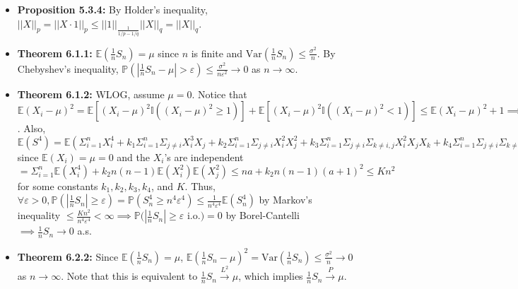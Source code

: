 \documentclass[12pt]{article}
\newcommand{\E}{\mathbb{E}}
\newcommand{\I}{\mathbb{I}}
\newcommand{\p}{\mathbb{P}}
\newcommand{\V}{\text{Var}}
\begin{document}
\begin{itemize}
    \item \textbf{Proposition 5.3.4:} By Holder's inequality, $||X||_p = ||X \cdot 1||_p \leq ||1||_{\frac{1}{1/p - 1/q}}||X||_q = ||X||_q$.
    \item \textbf{Theorem 6.1.1:} $\E(\frac{1}{n}S_n) = \mu$ since $n$ is finite and $\V(\frac{1}{n}S_n) \leq \frac{\sigma^2}{n}$. By Chebyshev's inequality, $\p(|\frac{1}{n}S_n - \mu| > \varepsilon) \leq \frac{\sigma^2}{n\varepsilon^2} \to 0$ as $n \to \infty$.
    \item \textbf{Theorem 6.1.2:} WLOG, assume $\mu = 0$. Notice that $\E(X_i - \mu)^2 = \E[(X_i - \mu)^2 \I((X_i - \mu)^2 \geq 1)] + \E[(X_i - \mu)^2 \I((X_i - \mu)^2 < 1)] \leq \E(X_i - \mu)^2 + 1 \implies \E(X_i - \mu)^2 \leq a + 1$. Also, $\E(S^4) = \E(\Sigma_{i=1}^n X_i^4 + k_1 \Sigma_{i=1}^n \Sigma_{j\neq i} X_i^3 X_j + k_2 \Sigma_{i=1}^n \Sigma_{j\neq i} X_i^2 X_j^2 + k_3 \Sigma_{i=1}^n \Sigma_{j\neq i} \Sigma_{k\neq i,j} X_i^2 X_j X_k + k_4 \Sigma_{i=1}^n \Sigma_{j\neq i} \Sigma_{k\neq i,j} \Sigma_{\ell \neq i,j,k} X_i X_j X_k X_\ell) = \E(\Sigma_{i=1}^n X_i^4 + k_2 \Sigma_{i=1}^n \Sigma_{j\neq i} X_i^2 X_j^2)$ since $\E(X_i) = \mu = 0$ and the $X_i$'s are independent $= \Sigma_{i=1}^n \E(X_i^4) + k_2 n(n-1)\E(X_i^2)\E(X_j^2) \leq na + k_2 n(n-1)(a+1)^2 \leq Kn^2$ for some constants $k_1, k_2, k_3, k_4$, and $K$. Thus, $\forall \varepsilon > 0, \p(|\frac{1}{n}S_n| \geq \varepsilon) = \p(S_n^4 \geq n^4\varepsilon^4) \leq \frac{1}{n^4\varepsilon^4}\E(S_n^4)$ by Markov's inequality $\leq \frac{Kn^2}{n^4\varepsilon^4} < \infty \implies \p(|\frac{1}{n}S_n| \geq \varepsilon$ i.o.$) = 0$ by Borel-Cantelli $\implies \frac{1}{n}S_n \to 0$ a.s.
    \item \textbf{Theorem 6.2.2:} Since $\E(\frac{1}{n}S_n) = \mu$, $\E(\frac{1}{n}S_n - \mu)^2 = \V(\frac{1}{n}S_n) \leq \frac{\sigma^2}{n} \to 0$ as $n \to \infty$. Note that this is equivalent to $\frac{1}{n}S_n \overset{L^2}{\to} \mu$, which implies $\frac{1}{n}S_n \overset{P}{\to} \mu$.

\end{itemize}
\end{document}
